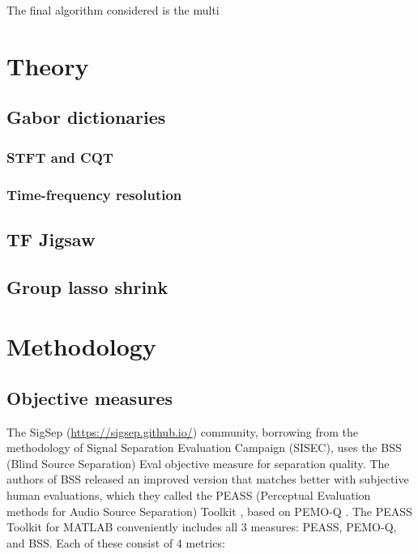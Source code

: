 \documentclass[letter,12pt]{article}
\begin{document}
The final algorithm considered is the multi

\section{Theory}
\label{sec:theory}

\subsection{Gabor dictionaries}

\subsubsection{STFT and CQT}

\subsubsection{Time-frequency resolution}

\subsection{TF Jigsaw}

\subsection{Group lasso shrink}

\section{Methodology}
\label{sec:methodology}

\subsection{Objective measures}

The SigSep (\href{https://sigsep.github.io/}{https://sigsep.github.io/}) community, borrowing from the methodology of Signal Separation Evaluation Campaign (SISEC), uses the BSS (Blind Source Separation) Eval \cite{bss} objective measure for separation quality. The authors of BSS released an improved version that matches better with subjective human evaluations, which they called the PEASS (Perceptual Evaluation methods for Audio Source Separation) Toolkit \cite{peass}, based on PEMO-Q \cite{pemoq}. The PEASS Toolkit for MATLAB \cite{peassmatlab} conveniently includes all 3 measures: PEASS, PEMO-Q, and BSS. Each of these consist of 4 metrics:
\end{document}
